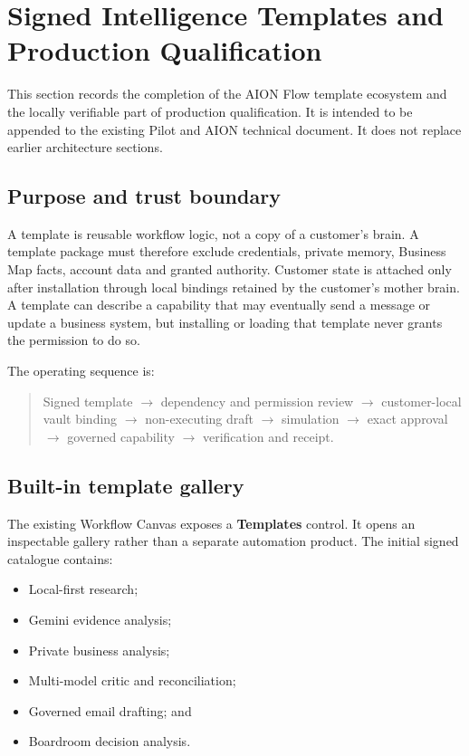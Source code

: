 \section{Signed Intelligence Templates and Production Qualification}
\label{sec:aion-flow-templates-production}

This section records the completion of the AION Flow template ecosystem and the locally verifiable
part of production qualification. It is intended to be appended to the existing Pilot and AION
technical document. It does not replace earlier architecture sections.

\subsection{Purpose and trust boundary}

A template is reusable workflow logic, not a copy of a customer's brain. A template package must
therefore exclude credentials, private memory, Business Map facts, account data and granted
authority. Customer state is attached only after installation through local bindings retained by
the customer's mother brain. A template can describe a capability that may eventually send a
message or update a business system, but installing or loading that template never grants the
permission to do so.

The operating sequence is:

\begin{quote}
Signed template $\rightarrow$ dependency and permission review $\rightarrow$ customer-local vault
binding $\rightarrow$ non-executing draft $\rightarrow$ simulation $\rightarrow$ exact approval
$\rightarrow$ governed capability $\rightarrow$ verification and receipt.
\end{quote}

\subsection{Built-in template gallery}

The existing Workflow Canvas exposes a \textbf{Templates} control. It opens an inspectable gallery
rather than a separate automation product. The initial signed catalogue contains:

\begin{itemize}
  \item Local-first research;
  \item Gemini evidence analysis;
  \item Private business analysis;
  \item Multi-model critic and reconciliation;
  \item Governed email drafting; and
  \item Boardroom decision analysis.
\end{itemize}

